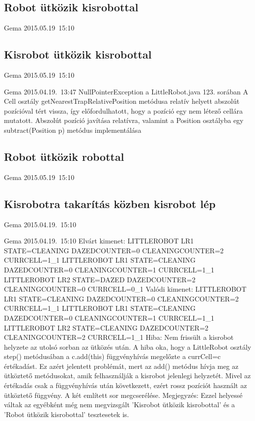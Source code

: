 \subsection{Robot ütközik kisrobottal}
\tesztok
{Gema}
{2015.05.19~15:10}

\subsection{Kisrobot ütközik kisrobottal}
\tesztok
{Gema}
{2015.05.19~15:10}

\tesztfail
{Gema}
{2015.04.19.~13:47}
{NullPointerException a LittleRobot.java 123. sorában}
{A Cell osztály getNearestTrapRelativePosition metódusa relatív helyett abszolút pozícióval tért vissza, így előfordulhatott, hogy a pozíció egy nem létező cellára mutatott.}
{Abszolút pozíció javítása relatívra, valamint a Position osztályba egy subtract(Position p) metódus implementálása}

\subsection{Robot ütközik robottal}
\tesztok
{Gema}
{2015.05.19~15:10}

\subsection{Kisrobotra takarítás közben kisrobot lép}
\tesztok
{Gema}
{2015.04.19.~15:10}

\tesztfail
{Gema}
{2015.04.19.~15:10}
{Elvárt kimenet:\newline
LITTLEROBOT LR1 STATE=CLEANING DAZEDCOUNTER=0 CLEANINGCOUNTER=2 CURRCELL=1\_1\newline
LITTLEROBOT LR1 STATE=CLEANING DAZEDCOUNTER=0 CLEANINGCOUNTER=1 CURRCELL=1\_1\newline
LITTLEROBOT LR2 STATE=DAZED DAZEDCOUNTER=2 CLEANINGCOUNTER=0 CURRCELL=0\_1\newline
Valódi kimenet:\newline
LITTLEROBOT LR1 STATE=CLEANING DAZEDCOUNTER=0 CLEANINGCOUNTER=2 CURRCELL=1\_1\newline
LITTLEROBOT LR1 STATE=CLEANING DAZEDCOUNTER=0 CLEANINGCOUNTER=1 CURRCELL=1\_1\newline
LITTLEROBOT LR2 STATE=CLEANING DAZEDCOUNTER=2 CLEANINGCOUNTER=2 CURRCELL=1\_1\newline
Hiba: Nem frissült a kisrobot helyzete az utolsó sorban az ütközés után.}
{A hiba oka, hogy a LittleRobot osztály step() metódusában a c.add(this) függvényhívás megelőzte a currCell=c értékadást. Ez azért jelentett problémát, mert az add() metódus hívja meg az ütköztető metódusokat, amik felhasználják a kisrobot jelenlegi helyzetét. Mivel az értékadás csak a függvényhívás után következett, ezért rossz pozíciót használt az ütköztető függvény.}
{A két említett sor megcserélése. Megjegyzés: Ezzel helyessé váltak az egyébként még nem megvizsgált 'Kisrobot ütközik kisrobottal' és a 'Robot ütközik kisrobottal' tesztesetek is.}


